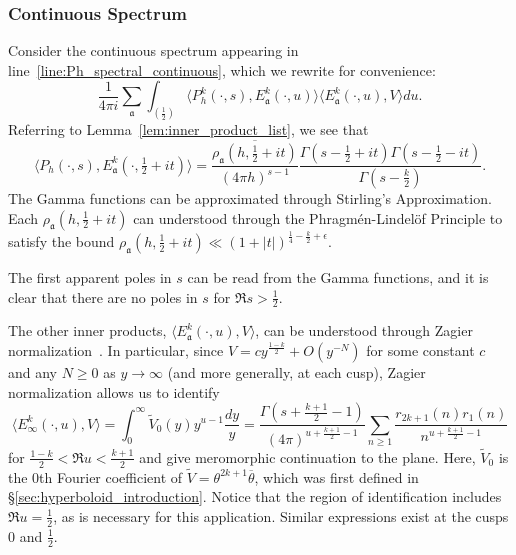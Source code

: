 \subsubsection*{Continuous Spectrum}



Consider the continuous spectrum appearing in line~\eqref{line:Ph_spectral_continuous},
which we rewrite for convenience:
\begin{equation}
  \frac{1}{4\pi i} \sum_{\mathfrak{a}} \int_{(\frac{1}{2})} \langle P_h^k(\cdot, s),
  E^k_{\mathfrak{a}}(\cdot, u) \rangle \langle E^k_{\mathfrak{a}}(\cdot, u), V \rangle du.
\end{equation}
Referring to Lemma~\ref{lem:inner_product_list}, we see that
\begin{equation}
  \langle P_h(\cdot, s), E_{\mathfrak{a}}^k(\cdot, \tfrac{1}{2} + it)\rangle =
  \frac{\overline{\rho_\mathfrak{a}(h, \tfrac{1}{2} + it)}}{(4\pi h)^{s-1}} \frac{\Gamma(s
  - \tfrac{1}{2} + it) \Gamma(s - \tfrac{1}{2} - it)}{\Gamma(s - \frac{k}{2})}.
\end{equation}
The Gamma functions can be approximated through Stirling's Approximation.
Each $\rho_\mathfrak{a}(h, \tfrac{1}{2} + it)$ can understood through the
Phragm\'en-Lindel\"of Principle to satisfy the bound $\rho_\mathfrak{a}(h, \frac{1}{2} +
it) \ll (1 + \lvert t \rvert)^{\frac{1}{4} - \frac{k}{2} + \epsilon}$.


The first apparent poles in $s$ can be read from the Gamma functions, and it is clear that
there are no poles in $s$ for $\Re s > \frac{1}{2}$.


The other inner products, $\langle E_\mathfrak{a}^k(\cdot, u), V \rangle$, can be
understood through Zagier normalization~\cite{ZagierRankinSelberg}.
In particular, since $V = c y^{\frac{1-k}{2}} + O(y^{-N})$ for some constant $c$ and any
$N \geq 0$ as $y \to \infty$ (and more generally, at each cusp), Zagier normalization
allows us to identify
\begin{equation}\label{eq:continuous_stepI}
  \langle E_\infty^k(\cdot, u), V \rangle = \int_0^\infty \widetilde{V}_0(y) y^{u-1}
  \frac{dy}{y} = \frac{\Gamma(s + \frac{k+1}{2} - 1)}{(4\pi)^{u + \frac{k+1}{2} - 1}}
  \sum_{n \geq 1} \frac{r_{2k+1}(n)r_1(n)}{n^{u + \frac{k+1}{2} - 1}}
\end{equation}
for $\frac{1-k}{2} < \Re u < \frac{k+1}{2}$ and give meromorphic continuation to the plane.
Here, $\widetilde{V}_0$ is the $0$th Fourier coefficient of $\widetilde{V} = \theta^{2k+1}
\overline{\theta}$, which was first defined in \S\ref{sec:hyperboloid_introduction}.
Notice that the region of identification includes $\Re u = \frac{1}{2}$, as is necessary
for this application.
Similar expressions exist at the cusps $0$ and $\frac{1}{2}$.



